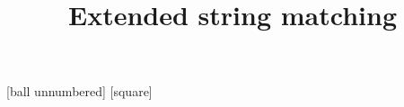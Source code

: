 \usepackage{bxdpx-beamer} %
\usepackage{pxjahyper} %
\usepackage{minijs} %
\usepackage{latexsym}
\usepackage[deluxe,expert]{otf}
\renewcommand{\kanjifamilydefault}{\gtdefault} %

\usepackage{tikz}
\usetikzlibrary{calc,decorations.pathreplacing,quotes,positioning,shapes,fit,arrows,backgrounds,tikzmark}

\usepackage{standalone}
\usepackage{import}

\usepackage{xcolor}
[ball unnumbered]
[square]

\usepackage[T1]{fontenc}%
\usepackage[utf8]{inputenc}%
\usepackage{txfonts}%
\usepackage{bm}%

\usepackage{amsmath,amssymb}
\usepackage{amsthm}
\usepackage{algorithm, algpseudocode}
\usepackage{enumitem}

\newcommand{\func}[1]{\ensuremath\mathrm{#1}}
\newcommand{\Scatter}{\text{\scshape Scatter}}
\newcommand{\Gather}{\text{\textsc{Gather}}}
\newcommand{\Propagate}{\func{\text{\textsc{Propagate}}}}
\newcommand{\ShiftAnd}{\textbf{Shift-And}}
\newcommand{\BNDM}{\textbf{BNDM}}
\newcommand{\ExShiftAnd}{\textbf{Extended-Shift-And}}
\newcommand{\ExBNDM}{\textbf{Extended-BNDM}}
\providecommand{\as}{\textasteriskcentered}
\providecommand{\pl}{\text{+}}

\providecommand{\ImportStandalone}[3]{
	\IfStandalone{
		{#3}
		}{
		{#3}
	}
}

\title{Extended string matching}
\institute{北海道大学　%
}
\author{%
}

